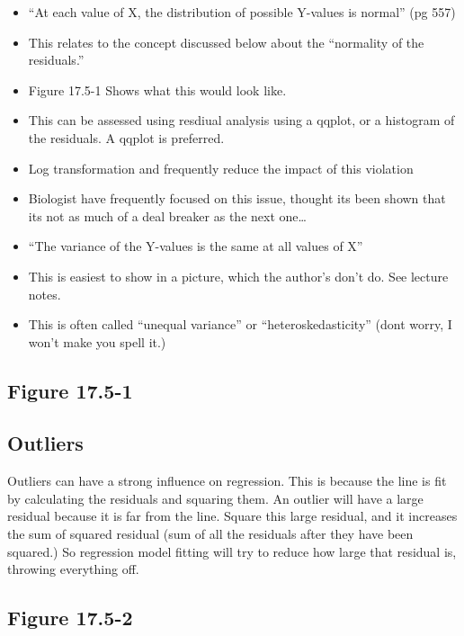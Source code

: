 \documentclass[]{book}
\providecommand{\tightlist}{%
  \setlength{\itemsep}{0pt}\setlength{\parskip}{0pt}}
\theoremstyle{definition}
\theoremstyle{definition}
\theoremstyle{definition}
\theoremstyle{remark}
\begin{document}
\begin{itemize}
\tightlist
\item
  ``At each value of X, the distribution of possible Y-values is
  normal'' (pg 557)
\item
  This relates to the concept discussed below about the ``normality of
  the residuals.''\\
\item
  Figure 17.5-1 Shows what this would look like.
\item
  This can be assessed using resdiual analysis using a qqplot, or a
  histogram of the residuals. A qqplot is preferred.
\item
  Log transformation and frequently reduce the impact of this violation
\item
  Biologist have frequently focused on this issue, thought its been
  shown that its not as much of a deal breaker as the next one\ldots{}
\item
  ``The variance of the Y-values is the same at all values of X''
\item
  This is easiest to show in a picture, which the author's don't do. See
  lecture notes.
\item
  This is often called ``unequal variance'' or ``heteroskedasticity''
  (dont worry, I won't make you spell it.)
\end{itemize}

\subsection{Figure 17.5-1}\label{figure-17.5-1}

\subsection{Outliers}\label{outliers}

Outliers can have a strong influence on regression. This is because the
line is fit by calculating the residuals and squaring them. An outlier
will have a large residual because it is far from the line. Square this
large residual, and it increases the sum of squared residual (sum of all
the residuals after they have been squared.) So regression model fitting
will try to reduce how large that residual is, throwing everything off.

\subsection{Figure 17.5-2}\label{figure-17.5-2}
\end{document}
